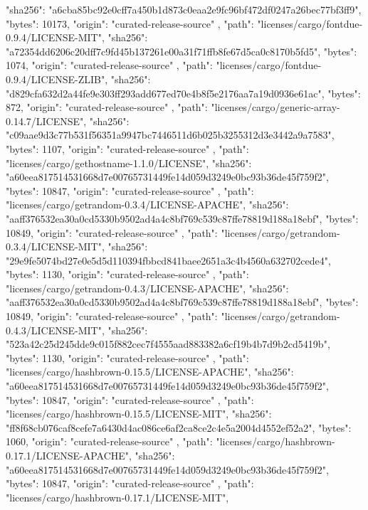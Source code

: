 {{      "sha256": "a6cba85bc92e0cff7a450b1d873c0eaa2e9fc96bf472df0247a26bec77bf3ff9",
      "bytes": 10173,
      "origin": "curated-release-source"
    },
    {
      "path": "licenses/cargo/fontdue-0.9.4/LICENSE-MIT",
      "sha256": "a72354dd6206c20dff7c9fd45b137261e00a31f71ffb8fe67d5ca0c8170b5fd5",
      "bytes": 1074,
      "origin": "curated-release-source"
    },
    {
      "path": "licenses/cargo/fontdue-0.9.4/LICENSE-ZLIB",
      "sha256": "d829cfa632d2a44fe9e303ff293add677ed70e4b8f5e2176aa7a19d0936e61ac",
      "bytes": 872,
      "origin": "curated-release-source"
    },
    {
      "path": "licenses/cargo/generic-array-0.14.7/LICENSE",
      "sha256": "c09aae9d3c77b531f56351a9947bc7446511d6b025b3255312d3e3442a9a7583",
      "bytes": 1107,
      "origin": "curated-release-source"
    },
    {
      "path": "licenses/cargo/gethostname-1.1.0/LICENSE",
      "sha256": "a60eea817514531668d7e00765731449fe14d059d3249e0bc93b36de45f759f2",
      "bytes": 10847,
      "origin": "curated-release-source"
    },
    {
      "path": "licenses/cargo/getrandom-0.3.4/LICENSE-APACHE",
      "sha256": "aaff376532ea30a0cd5330b9502ad4a4c8bf769c539c87ffe78819d188a18ebf",
      "bytes": 10849,
      "origin": "curated-release-source"
    },
    {
      "path": "licenses/cargo/getrandom-0.3.4/LICENSE-MIT",
      "sha256": "29e9fe5074bd27e0e5d5d110394fbbcd841baee2651a3c4b4560a632702cede4",
      "bytes": 1130,
      "origin": "curated-release-source"
    },
    {
      "path": "licenses/cargo/getrandom-0.4.3/LICENSE-APACHE",
      "sha256": "aaff376532ea30a0cd5330b9502ad4a4c8bf769c539c87ffe78819d188a18ebf",
      "bytes": 10849,
      "origin": "curated-release-source"
    },
    {
      "path": "licenses/cargo/getrandom-0.4.3/LICENSE-MIT",
      "sha256": "523a42c25d245dde9c015f882cec7f4555aad883382a6cf19b4b7d9b2cd5419b",
      "bytes": 1130,
      "origin": "curated-release-source"
    },
    {
      "path": "licenses/cargo/hashbrown-0.15.5/LICENSE-APACHE",
      "sha256": "a60eea817514531668d7e00765731449fe14d059d3249e0bc93b36de45f759f2",
      "bytes": 10847,
      "origin": "curated-release-source"
    },
    {
      "path": "licenses/cargo/hashbrown-0.15.5/LICENSE-MIT",
      "sha256": "ff8f68cb076caf8cefe7a6430d4ac086ce6af2ca8ce2c4e5a2004d4552ef52a2",
      "bytes": 1060,
      "origin": "curated-release-source"
    },
    {
      "path": "licenses/cargo/hashbrown-0.17.1/LICENSE-APACHE",
      "sha256": "a60eea817514531668d7e00765731449fe14d059d3249e0bc93b36de45f759f2",
      "bytes": 10847,
      "origin": "curated-release-source"
    },
    {
      "path": "licenses/cargo/hashbrown-0.17.1/LICENSE-MIT",
}}
